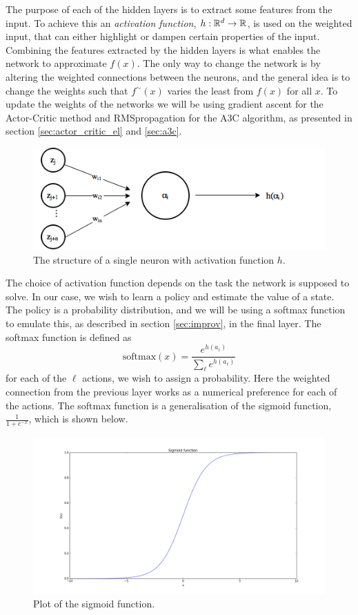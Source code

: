 \documentclass[11pt]{article}
\begin{document}
The purpose of each of the hidden layers is to extract some features from the input.
To achieve this an \textit{activation function}, $h: \mathbb{R}^d \to \mathbb{R}$, is used on the weighted
input, that can either highlight or dampen
certain properties of the input.
Combining the features extracted by the hidden layers is what enables the network
to approximate $f(x)$.
The only way to change the network is by altering the weighted connections
between the neurons, and the general idea is to change the weights such that
$f^\sim(x)$ varies the least from $f(x)$ for all $x$.
To update the weights of the networks we will be using gradient ascent
for the Actor-Critic method and RMSpropagation for the A3C algorithm,
as presented in section \ref{sec:actor_critic_el} and \ref{sec:a3c}.
\begin{figure}[!h]
    \centering
    \includegraphics[width=12cm]{include/neuron.png}
    \caption{The structure of a single neuron with activation function $h$.}
    \label{fig:neuron}
\end{figure}

The choice of activation function depends on the task the
network is supposed to solve.
In our case, we wish to learn a policy and estimate the value of a state.
The policy is a probability distribution, and we will be using a softmax function
to emulate this, as described in section \ref{sec:improv}, in the final layer.
The softmax function is defined as
\begin{equation}
    \text{softmax}(x) = \frac{e^{h(a_i)}}{\sum\limits_{\ell} e^{h(a_\ell)}}
\end{equation}
for each of the $\ell$ actions, we wish to assign a probability.
Here the weighted connection from the previous layer works as
a numerical preference for each of the actions.
The softmax function is a generalisation of the sigmoid function, $\frac{1}{1 + e^{-x}}$,
which is shown below.
\begin{figure}[!h]
    \centering
    \includegraphics[width=15cm]{include/sigmoid.png}
    \caption{Plot of the sigmoid function.}
    \label{fig:softmax}
\end{figure}
\end{document}
